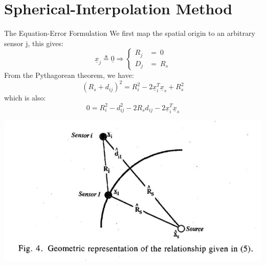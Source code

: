 \documentclass[10pt]{beamer}
\begin{document}
\section{Spherical-Interpolation Method}

\begin{frame}{The Equation-Error Formulation}
  We first map the spatial origin to an arbitrary sensor j, this gives:
  $$ \underline{x}_{j}\triangleq \underline{0}\Longrightarrow \begin{cases} R_{j} &= \ 0 \\ D_{j} &= \ R_{s} \end{cases}$$
  From the Pythagorean theorem, we have:
  $$(R_{s}+d_{ij})^2 = R_{i}^2 - 2\underline{x}_{i}^T \underline{x}_{s} + R_{s}^2 $$
  which is also:
  $$ 0 = R_{i}^2 - d_{ij}^2 -2R_{s}d_{ij} - 2\underline{x}_{i}^T \underline{x}_{s} $$
  \begin{center}
  \includegraphics[scale=0.7]{Pythagorean.JPG}
  \end{center}
\end{frame}
\end{document}
